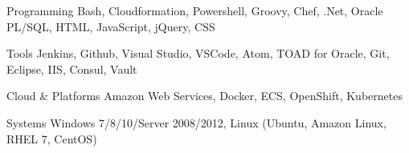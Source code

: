 

\begin{cvskills}

  \cvskill
    {Programming} %
    {Bash, Cloudformation, Powershell, Groovy, Chef, .Net, Oracle PL/SQL, HTML, JavaScript, jQuery, CSS} %

  \cvskill
    {Tools} %
    {Jenkins, Github, Visual Studio, VSCode, Atom, TOAD for Oracle, Git, Eclipse, IIS, Consul, Vault} %

  \cvskill
    {Cloud \& Platforms} %
    {Amazon Web Services, Docker, ECS, OpenShift, Kubernetes} %

  \cvskill
    {Systems} %
    {Windows 7/8/10/Server 2008/2012, Linux (Ubuntu, Amazon Linux, RHEL 7, CentOS)} %

\end{cvskills}
